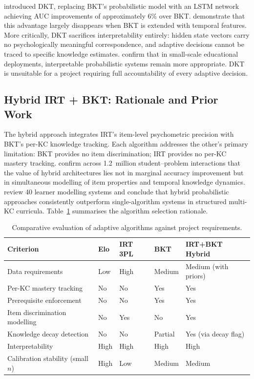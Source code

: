 \textcite{piech2015} introduced DKT, replacing BKT's probabilistic model with
an LSTM network achieving AUC improvements of approximately 6\% over BKT.
\textcite{khajah2016} demonstrate that this advantage largely disappears when
BKT is extended with temporal features. More critically, DKT sacrifices
interpretability entirely: hidden state vectors carry no psychologically
meaningful correspondence, and adaptive decisions cannot be traced to specific
knowledge estimates. \textcite{matos2025} confirm that in small-scale
educational deployments, interpretable probabilistic systems remain more
appropriate. DKT is unsuitable for a project requiring full accountability
of every adaptive decision.

\subsection{Hybrid IRT + BKT: Rationale and Prior Work}
\label{subsec:lr_hybrid}

The hybrid approach integrates IRT's item-level psychometric precision with
BKT's per-KC knowledge tracking. Each algorithm addresses the other's primary
limitation: BKT provides no item discrimination; IRT provides no per-KC mastery
tracking. \textcite{kaser2017} confirm across 1.2~million student--problem
interactions that the value of hybrid architectures lies not in marginal
accuracy improvement but in simultaneous modelling of item properties and
temporal knowledge dynamics. \textcite{desmarais2012} review 40 learner
modelling systems and conclude that hybrid probabilistic approaches consistently
outperform single-algorithm systems in structured multi-KC curricula.
Table~\ref{tab:algo_comparison} summarises the algorithm selection rationale.

\begin{table}[H]
\centering
\caption{Comparative evaluation of adaptive algorithms against project requirements.}
\label{tab:algo_comparison}
\renewcommand{\arraystretch}{1.3}
\begin{tabularx}{\textwidth}{lXXXX}
\toprule
\textbf{Criterion} & \textbf{Elo} & \textbf{IRT 3PL} & \textbf{BKT} & \textbf{IRT+BKT Hybrid} \\
\midrule
Data requirements & Low & High & Medium & Medium (with priors) \\
Per-KC mastery tracking & No & No & Yes & Yes \\
Prerequisite enforcement & No & No & Yes & Yes \\
Item discrimination modelling & No & Yes & No & Yes \\
Knowledge decay detection & No & No & Partial & Yes (via decay flag) \\
Interpretability & High & High & High & High \\
Calibration stability (small $n$) & High & Low & Medium & Medium \\
\bottomrule
\end{tabularx}
\end{table}

